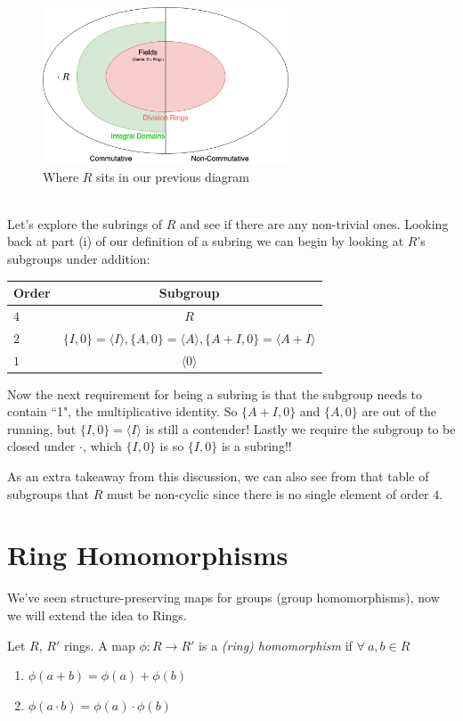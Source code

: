 \begin{example}
\begin{figure}[h!]
    \includegraphics[width=0.65\textwidth]{Figures/Example_Ring_Figure.png}
    \caption{Where $R$ sits in our previous diagram}
    \label{fig:R_comm_ring}
\end{figure}\\
Let's explore the subrings of $R$ and see if there are any non-trivial ones. Looking back at part (i) of our definition of a subring we can begin by looking at $R$'s subgroups under addition:
\begin{center}
    \begin{tabular}{|l|c|} \hline
         \textbf{Order } & \textbf{Subgroup}  \\ \hline
         $4$ & $R$ \\ \hline
         $2$ & $\{I,0\}=\langle I \rangle, \{A,0\}=\langle A \rangle, \{A+I,0\}= \langle A+I \rangle$ \\ \hline
         $1$ & $\langle 0 \rangle $ \\ \hline
\end{tabular}
\end{center}
Now the next requirement for being a subring is that the subgroup needs to contain ``1", the multiplicative identity. So $\{A+I,0\}$ and $\{A,0\}$ are out of the running, but $\{I,0\}=\langle I \rangle$ is still a contender! Lastly we require the subgroup to be closed under $\cdot$, which $\{I,0\}$ is so $\{I,0\}$ is a subring!!

As an extra takeaway from this discussion, we can also see from that table of subgroups that $R$ must be non-cyclic since there is no single element of order $4$.
\end{example}
\newpage
\section{Ring Homomorphisms}
We've seen structure-preserving maps for groups (group homomorphisms), now we will extend the idea to Rings.
\begin{definition} 
Let $R$, $R'$ rings. A map $\phi : R \rightarrow R'$ is a \textit{(ring) homomorphism} if $\forall \ a,b \in R$
\begin{enumerate}
    \item $\phi(a+b)=\phi(a)+\phi(b)$ 
    \item $\phi(a\cdot b) = \phi(a)\cdot \phi(b)$
\end{enumerate}
\end{definition}

